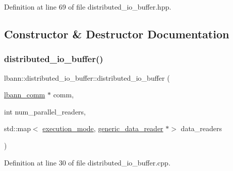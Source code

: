 Definition at line 69 of file distributed\+\_\+io\+\_\+buffer.\+hpp.



\subsection{Constructor \& Destructor Documentation}
\mbox{\label{classlbann_1_1distributed__io__buffer_a2066033e844ec7b9b95dfe7615a0a256}} 
\subsubsection{\texorpdfstring{distributed\+\_\+io\+\_\+buffer()}{distributed\_io\_buffer()}\hspace{0.1cm}{\footnotesize\ttfamily [1/2]}}
{\footnotesize\ttfamily lbann\+::distributed\+\_\+io\+\_\+buffer\+::distributed\+\_\+io\+\_\+buffer (\begin{DoxyParamCaption}\item[{\hyperlink{classlbann_1_1lbann__comm}{lbann\+\_\+comm} $\ast$}]{comm,  }\item[{int}]{num\+\_\+parallel\+\_\+readers,  }\item[{std\+::map$<$ \hyperlink{base_8hpp_a2781a159088df64ed7d47cc91c4dc0a8}{execution\+\_\+mode}, \hyperlink{classlbann_1_1generic__data__reader}{generic\+\_\+data\+\_\+reader} $\ast$$>$}]{data\+\_\+readers }\end{DoxyParamCaption})}



Definition at line 30 of file distributed\+\_\+io\+\_\+buffer.\+cpp.


